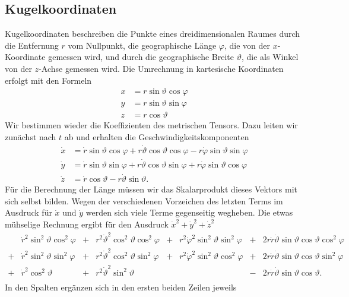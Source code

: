 \subsection{Kugelkoordinaten}
Kugelkoordinaten beschreiben die Punkte eines dreidimensionalen Raumes
durch die Entfernung $r$ vom Nullpunkt, die geographische Länge
$\varphi$, die von
der $x$-Koordinate gemessen wird, und durch die geographische Breite
$\vartheta$,
die als Winkel von der $z$-Achse gemessen wird.
Die Umrechnung in kartesische Koordinaten erfolgt mit den Formeln
\begin{align*}
x&= r\sin\vartheta\cos\varphi\\
y&= r\sin\vartheta\sin\varphi\\
z&= r\cos\vartheta
\end{align*}
Wir bestimmen wieder die Koeffizienten des metrischen Tensors.
Dazu leiten wir zunächst nach $t$ ab und erhalten
die Geschwindigkeitskomponenten
\begin{align*}
\dot x
&=
\dot r\sin\vartheta\cos\varphi
+
r\dot\vartheta \cos\vartheta\cos\varphi
-
r\dot\varphi \sin\vartheta\sin\varphi
\\
\dot y
&=
\dot r\sin\vartheta\sin\varphi
+
r\dot\vartheta\cos\vartheta\sin\varphi
+
r\dot\varphi\sin\vartheta\cos\varphi
\\
\dot z
&=
\dot r\cos\vartheta
-
r\dot\vartheta \sin\vartheta.
\end{align*}
Für die Berechnung der Länge müssen wir das Skalarprodukt dieses
Vektors mit sich selbst bilden.
Wegen der verschiedenen Vorzeichen des letzten Terms im Ausdruck für
$\dot x$ und $\dot y$  werden sich viele Terme gegenseitig wegheben.
Die etwas mühselige Rechnung ergibt für den Ausdruck
$\dot x^2 + \dot y^2 + \dot z^2$ 
\[
\begin{array}{clclclcl}
 &
\dot r^2\sin^2\vartheta\cos^2\varphi
	&+&r^2\dot\vartheta^2\cos^2\vartheta\cos^2\varphi
		&+&r^2\dot\varphi^2\sin^2\vartheta\sin^2\varphi
			&+&2r\dot r\dot\vartheta\sin\vartheta\cos\vartheta\cos^2\varphi
\\
+&
\dot r^2\sin^2\vartheta\sin^2\varphi
	&+&r^2\dot\vartheta^2\cos^2\vartheta\sin^2\varphi
		&+&r^2\dot\varphi^2\sin^2\vartheta\cos^2\varphi
			&+&2r\dot r\dot\vartheta\sin\vartheta\cos\vartheta\sin^2\varphi
\\
+&
\dot r^2\cos^2\vartheta
	&+&r^2\dot\vartheta^2\sin^2\vartheta
		& &
			&-&2r\dot r\dot\vartheta \sin\vartheta \cos\vartheta.
\\
\end{array}
\]
In den Spalten ergänzen sich in den ersten beiden Zeilen jeweils
